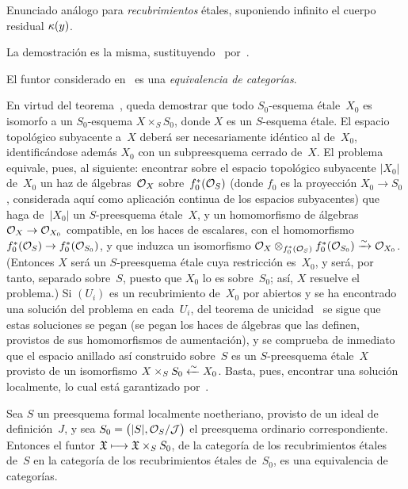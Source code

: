 \begin{corollaire}
\label{I.8.2}
Enunciado análogo para \emph{recubrimientos} étales, suponiendo infinito el cuerpo residual $\kres(y)$.
\end{corollaire}

La demostración es la misma, sustituyendo~ por~.

\begin{theoreme}
\label{I.8.3}
El funtor considerado en~ es una \emph{equivalencia de categorías}.
\end{theoreme}

En virtud del teorema~, queda demostrar que todo $S_0$-esquema étale~$X_0$ es isomorfo a un $S_0$-esquema $X\times_SS_0$, donde $X$ es un $S$-esquema étale. El espacio topológico subyacente a~$X$ deberá ser necesariamente idéntico al de~$X_0$, identificándose además $X_0$ con un subpreesquema cerrado de~$X$. El problema equivale, pues, al siguiente: encontrar sobre el espacio topológico subyacente $|X_0|$ de~$X_0$ un haz de álgebras~$\cal{O}_X$ sobre~$f_0^*(\cal{O}_S)$ (donde $f_0$ es la proyección $X_0\to S_0$, considerada aquí como aplicación continua de los espacios subyacentes) que haga de~$|X_0|$ un $S$-preesquema étale~$X$, y un homomorfismo de álgebras $\cal{O}_X\to\cal{O}_{X_0}$ compatible, en los haces de escalares, con el homomorfismo $f_0^*(\cal{O}_S)\to f_0^*(\cal{O}_{S_0})$, y que induzca un isomorfismo
$\cal{O}_X\otimes_{f_0^*(\cal{O}_S)}f_0^*(\cal{O}_{S_0})\isomto\cal{O}_{X_0}$.
(Entonces $X$ será un $S$-preesquema étale cuya restricción es~$X_0$,
y será, por tanto, separado sobre~$S$, puesto que $X_0$ lo es sobre~$S_0$; así, $X$ resuelve el problema.) Si $(U_i)$ es un recubrimiento de~$X_0$ por abiertos y se ha encontrado una solución del problema en cada~$U_i$, del teorema de unicidad~ se sigue que estas soluciones se pegan (\ie se pegan los haces de álgebras que las definen, provistos de sus homomorfismos de aumentación), y se comprueba de inmediato que el espacio anillado así construido sobre~$S$ es un $S$-preesquema étale~$X$ provisto de un isomorfismo $X\times_SS_0\isomfrom X_0$. Basta, pues, encontrar una solución localmente, lo cual está garantizado por~.

\begin{corollaire}
\label{I.8.4}
Sea $S$ un preesquema formal localmente noetheriano, provisto de un ideal de definición~$J$, y sea $S_0=\bigl(|S|,\cal{O}_S/\cal{J}\bigr)$ el preesquema ordinario correspondiente. Entonces el funtor $\goth{X}\mto\goth{X}\times_SS_0$, de la categoría de los recubrimientos étales de~$S$ en la categoría de los recubrimientos étales de~$S_0$, es una equivalencia de categorías.
\end{corollaire}

